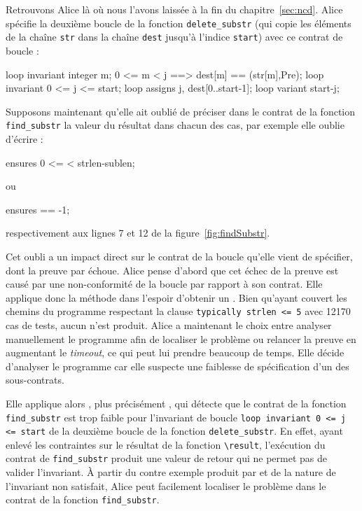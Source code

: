 Retrouvons Alice là où nous l'avons laissée à la fin du chapitre~\ref{sec:ncd}.
Alice spécifie la deuxième boucle de la fonction
\lstinline'delete_substr' (qui copie les éléments de la
chaîne \lstinline'str' dans la chaîne \lstinline'dest' jusqu'à l'indice
\lstinline'start') avec ce contrat de boucle :

\begin{pretty-codeACSL}
loop invariant \forall integer m; 0 <= m < j ==> dest[m] == \at(str[m],Pre);
loop invariant 0 <= j <= start;
loop assigns j, dest[0..start-1];
loop variant start-j;
\end{pretty-codeACSL}

Supposons maintenant qu'elle ait oublié de préciser dans le contrat de la
fonction \lstinline'find_substr' la valeur du résultat dans chacun des cas, par
exemple elle oublie d'écrire :

\begin{pretty-codeACSL}
ensures 0 <= \result < strlen-sublen;
\end{pretty-codeACSL}

ou

\begin{pretty-codeACSL}
ensures \result == -1;
\end{pretty-codeACSL}

respectivement aux lignes 7 et 12 de la figure~\ref{fig:findSubstr}.

Cet oubli a un impact direct sur le contrat de la boucle qu'elle vient de
spécifier, dont la preuve par \Wp échoue.
Alice pense d'abord que cet échec de la preuve est causé par une non-conformité
de la boucle par rapport à son contrat.
Elle applique donc la méthode \NCD dans l'espoir d'obtenir un \NCCE.
Bien qu'ayant couvert les chemins du programme respectant la clause
\lstinline'typically strlen <= 5' avec 12170 cas de tests, aucun \NCCE n'est
produit.
Alice a maintenant le choix entre analyser manuellement le programme afin
de localiser le problème ou relancer la preuve en augmentant le {\em timeout},
ce qui peut lui prendre beaucoup de temps.
Elle décide d'analyser le programme car elle suspecte une faiblesse de
spécification d'un des sous-contrats.

Elle applique alors \SWD, plus précisément \SSWD, qui détecte que le contrat de
la fonction \lstinline'find_substr' est trop faible pour l'invariant de boucle
\lstinline'loop invariant 0 <= j <= start' de la deuxième boucle de la fonction
\lstinline'delete_substr'.
En effet, ayant enlevé les contraintes sur le résultat de la fonction
\lstinline'\result', l'exécution du contrat de \lstinline'find_substr' produit
une valeur de retour qui ne permet pas de valider l'invariant.
À partir du contre exemple produit par \SSWD et de la nature de l'invariant non
satisfait, Alice peut facilement localiser le problème dans le contrat de la
fonction \lstinline'find_substr'.

